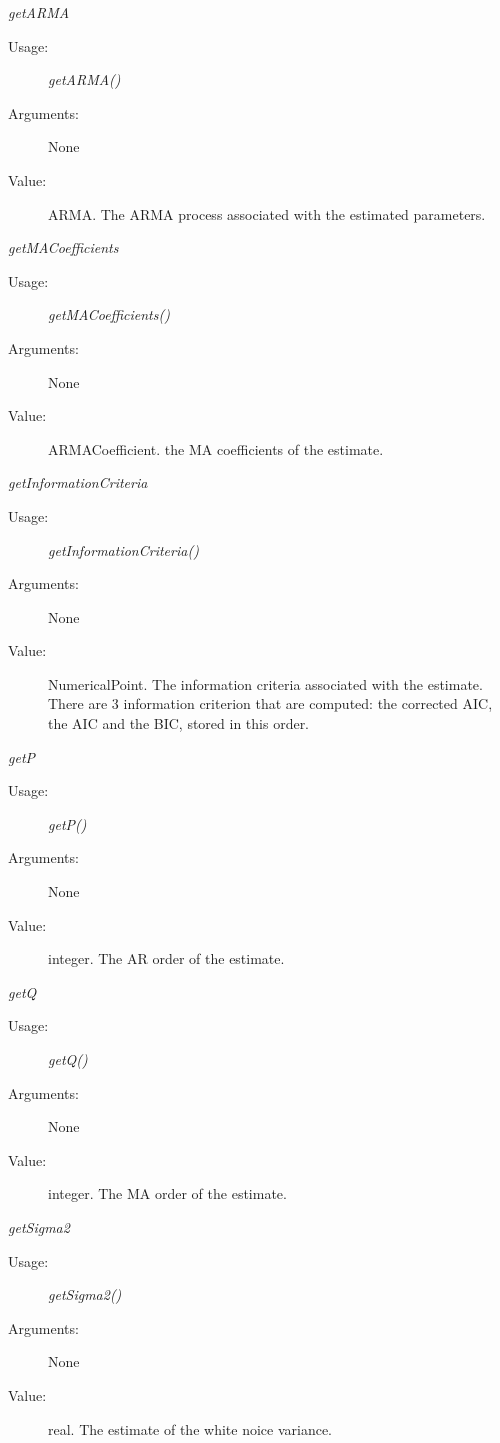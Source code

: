 \begin{description}
\begin{description}
\item \textit{getARMA}
\begin{description}
\item[Usage:] \textit{getARMA()}
\item[Arguments:] None
\item[Value:] ARMA. The ARMA process associated with the estimated parameters.
\end{description}
\bigskip

\item \textit{getMACoefficients}
\begin{description}
\item[Usage:] \textit{getMACoefficients()}
\item[Arguments:] None
\item[Value:] ARMACoefficient. the MA coefficients of the estimate.
\end{description}
\bigskip

\item \textit{getInformationCriteria}
\begin{description}
\item[Usage:] \textit{getInformationCriteria()}
\item[Arguments:] None
\item[Value:] NumericalPoint. The information criteria associated with the estimate. There are 3 information criterion that are computed: the corrected AIC, the AIC and the BIC, stored in this order.
\end{description}
\bigskip

\item \textit{getP}
\begin{description}
\item[Usage:] \textit{getP()}
\item[Arguments:] None
\item[Value:] integer. The AR order of the estimate.
\end{description}
\bigskip

\item \textit{getQ}
\begin{description}
\item[Usage:] \textit{getQ()}
\item[Arguments:] None
\item[Value:] integer. The MA order of the estimate.
\end{description}
\bigskip

\item \textit{getSigma2}
\begin{description}
\item[Usage:] \textit{getSigma2()}
\item[Arguments:] None
\item[Value:] real. The estimate of the white noice variance.
\end{description}
\bigskip


\end{description}
\end{description}
